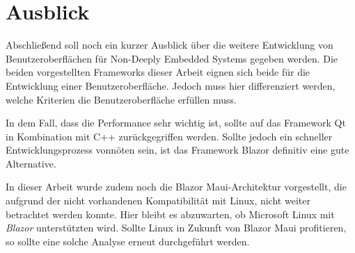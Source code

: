 \chapter{Ausblick}
\label{chp:ausblick}
Abschließend soll noch ein kurzer Ausblick über die weitere Entwicklung von Benutzeroberflächen für
Non-Deeply Embedded Systems gegeben werden. Die beiden vorgestellten Frameworks dieser Arbeit
eignen sich beide für die Entwicklung einer Benutzeroberfläche. Jedoch muss hier differenziert
werden, welche Kriterien die Benutzeroberfläche erfüllen muss.

In dem Fall, dass die Performance sehr wichtig ist, sollte auf das Framework Qt in
Kombination mit C++ zurückgegriffen werden. Sollte jedoch ein schneller Entwicklungsprozess
vonnöten sein, ist das Framework Blazor definitiv eine gute Alternative.

In dieser Arbeit wurde zudem noch die Blazor Maui-Architektur vorgestellt, die aufgrund der nicht
vorhandenen Kompatibilität mit Linux, nicht weiter betrachtet werden konnte. Hier bleibt es
abzuwarten, ob Microsoft Linux mit \emph{Blazor} unterstützten wird. Sollte Linux in Zukunft
von Blazor Maui profitieren, so sollte eine solche Analyse erneut durchgeführt werden.